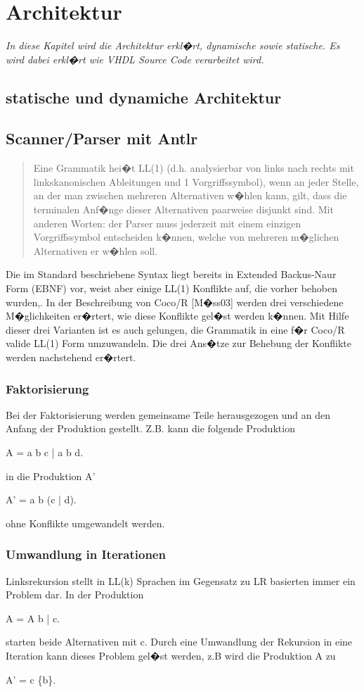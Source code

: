 \chapter{Architektur}
{\em 
In diese Kapitel wird die Architektur erkl�rt, dynamische sowie statische. Es wird dabei erkl�rt wie VHDL Source Code verarbeitet wird.
}
\section{statische und dynamiche Architektur}
\section{Scanner/Parser mit Antlr}
\begin{quotation}
Eine Grammatik hei�t LL(1) (d.h. analysierbar von links nach rechts mit linkskanonischen Ableitungen und 1 Vorgriffssymbol), wenn an jeder Stelle, an der man zwischen mehreren Alternativen w�hlen kann, gilt, dass die terminalen Anf�nge dieser Alternativen paarweise disjunkt sind. Mit anderen Worten: der Parser muss jederzeit mit einem einzigen Vorgriffssymbol entscheiden k�nnen, welche von mehreren m�glichen Alternativen er w�hlen soll. \cite{moess}
\end{quotation}

Die im Standard \cite{ieee} beschriebene Syntax liegt bereits in Extended Backus-Naur Form (EBNF) \cite{wirth} vor, weist aber einige LL(1) Konflikte auf, die vorher behoben wurden,.
In der Beschreibung von Coco/R [M�ss03] werden drei verschiedene M�glichkeiten er�rtert, wie diese Konflikte gel�st werden k�nnen. Mit Hilfe dieser drei Varianten ist es auch gelungen, die Grammatik in eine f�r Coco/R valide LL(1) Form umzuwandeln. Die drei Ans�tze zur Behebung der Konflikte werden nachstehend er�rtert.

\subsection{Faktorisierung}
Bei der Faktorisierung werden gemeinsame Teile herausgezogen und an den Anfang der Produktion gestellt. Z.B. kann die folgende Produktion
\begin{center} A = a b c | a b d. \end{center} 
in die Produktion A'
\begin{center} A' = a b (c | d). \end{center} 
ohne Konflikte umgewandelt werden.
\subsection{Umwandlung in Iterationen}
Linksrekursion stellt in LL(k) Sprachen im Gegensatz zu LR basierten immer ein Problem dar. In der Produktion
\begin{center} A = A b | c. \end{center} 
starten beide Alternativen mit c. Durch eine Umwandlung der Rekursion in eine Iteration kann dieses Problem gel�st werden, z.B wird die Produktion A zu
\begin{center} A' = c \{b\}. \end{center} 
